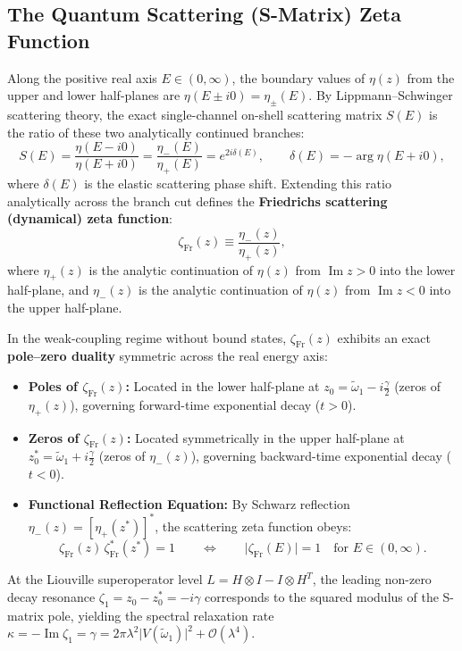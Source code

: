 \documentclass[11pt,a4paper]{article}
\newcommand{\Arg}{\operatorname{arg}}
\newcommand{\Imag}{\operatorname{Im}}
\begin{document}
\subsection{The Quantum Scattering (S-Matrix) Zeta Function}

Along the positive real axis $E \in (0,\infty)$, the boundary values of $\eta(z)$ from the upper and lower half-planes are $\eta(E \pm i0) = \eta_\pm(E)$. By Lippmann--Schwinger scattering theory, the exact single-channel on-shell scattering matrix $S(E)$ is the ratio of these two analytically continued branches:
\begin{equation}
S(E) = \frac{\eta(E - i0)}{\eta(E + i0)} = \frac{\eta_-(E)}{\eta_+(E)} = e^{2i\delta(E)}, \qquad \delta(E) = -\Arg \eta(E + i0),
\end{equation}
where $\delta(E)$ is the elastic scattering phase shift. Extending this ratio analytically across the branch cut defines the \textbf{Friedrichs scattering (dynamical) zeta function}:
\begin{equation}\label{eq:friedrichs_zeta}
\zeta_{\mathrm{Fr}}(z) \equiv \frac{\eta_-(z)}{\eta_+(z)},
\end{equation}
where $\eta_+(z)$ is the analytic continuation of $\eta(z)$ from $\Imag z > 0$ into the lower half-plane, and $\eta_-(z)$ is the analytic continuation of $\eta(z)$ from $\Imag z < 0$ into the upper half-plane.

In the weak-coupling regime without bound states, $\zeta_{\mathrm{Fr}}(z)$ exhibits an exact \textbf{pole--zero duality} symmetric across the real energy axis:
\begin{itemize}
    \item \textbf{Poles of $\zeta_{\mathrm{Fr}}(z)$:} Located in the lower half-plane at $z_0 = \tilde{\omega}_1 - i\frac{\gamma}{2}$ (zeros of $\eta_+(z)$), governing forward-time exponential decay ($t > 0$).
    \item \textbf{Zeros of $\zeta_{\mathrm{Fr}}(z)$:} Located symmetrically in the upper half-plane at $z_0^* = \tilde{\omega}_1 + i\frac{\gamma}{2}$ (zeros of $\eta_-(z)$), governing backward-time exponential decay ($t < 0$).
    \item \textbf{Functional Reflection Equation:} By Schwarz reflection $\eta_-(z) = [\eta_+(z^*)]^*$, the scattering zeta function obeys:
    \begin{equation}
    \zeta_{\mathrm{Fr}}(z)\,\zeta_{\mathrm{Fr}}^*(z^*) = 1 \qquad \Longleftrightarrow \qquad \lvert \zeta_{\mathrm{Fr}}(E)\rvert = 1 \quad \text{for } E \in (0,\infty).
    \end{equation}
\end{itemize}
At the Liouville superoperator level $L = H \otimes I - I \otimes H^T$, the leading non-zero decay resonance $\zeta_1 = z_0 - z_0^* = -i\gamma$ corresponds to the squared modulus of the S-matrix pole, yielding the spectral relaxation rate $\kappa = -\Imag \zeta_1 = \gamma = 2\pi\lambda^2\lvert V(\tilde{\omega}_1)\rvert^2 + \mathcal{O}(\lambda^4)$.
\end{document}
